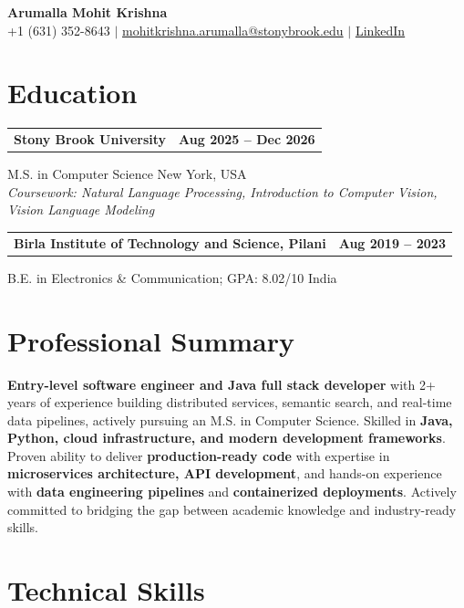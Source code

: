 \documentclass[letterpaper,10pt]{article}
\makeatletter
\newcommand{\entry}[2]{%
  \noindent  
  \begin{tabularx}{\linewidth}  
    {@{}>{\raggedright\arraybackslash}X@{\hspace{6pt}}r@{}}  
    \textbf{#1} & #2  
  \end{tabularx}\par  
}
\makeatother
\begin{document}
  

\begin{center}  
    {\LARGE\bfseries Arumalla Mohit Krishna}\\[3pt]  
    +1 (631) 352-8643 $|$  
    \href{mailto:mohitkrishna.arumalla@stonybrook.edu}  
    {mohitkrishna.arumalla@stonybrook.edu} $|$  
    \href{https://linkedin.com/in/mohit-krishna-arumalla}  
    {LinkedIn}  
\end{center}  
\vspace{-8pt}  

\section{Education}  

\entry  
  {\textbf{Stony Brook University}}  
  {\textbf{Aug 2025 -- Dec 2026}}  

M.S. in Computer Science \hfill New York, USA\\  
\textit{Coursework: Natural Language Processing, Introduction to Computer Vision, Vision Language Modeling}  
\vspace{3pt}  

\entry  
  {\textbf{Birla Institute of Technology and Science, Pilani}}  
  {\textbf{Aug 2019 -- 2023}}  

B.E. in Electronics \& Communication; GPA: 8.02/10 \hfill India  

\section{Professional Summary}  

\textbf{Entry-level software engineer and Java full stack developer} with 2+ years of experience building distributed services, semantic search, and real-time data pipelines, actively pursuing an M.S. in Computer Science. Skilled in \textbf{Java, Python, cloud infrastructure, and modern development frameworks}. Proven ability to deliver \textbf{production-ready code} with expertise in \textbf{microservices architecture, API development}, and hands-on experience with \textbf{data engineering pipelines} and \textbf{containerized deployments}. Actively committed to bridging the gap between academic knowledge and industry-ready skills.  

\section{Technical Skills}  
\end{document}
